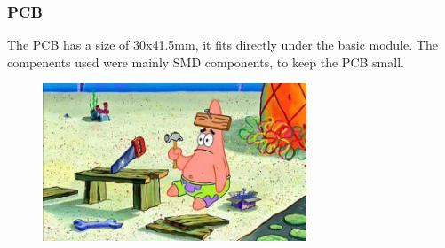     \subsubsection{PCB}

        The PCB has a size of 30x41.5mm, it fits directly under the basic module. 
        The compenents used were mainly SMD components, to keep the PCB small. 

        \begin{figure}[H]
            \centering
            \includegraphics[width=0.7\textwidth]{assets/HW/TBD.png}
        \end{figure}


